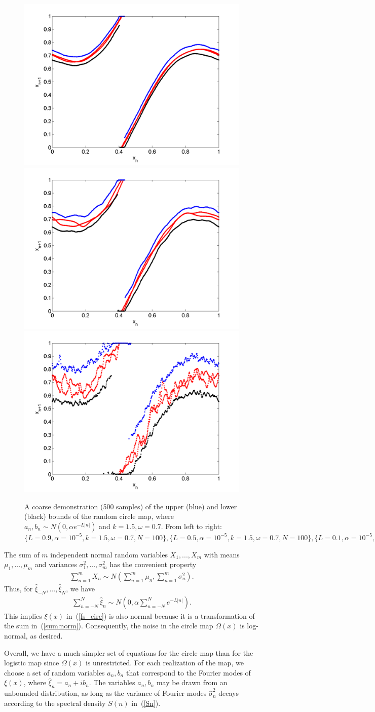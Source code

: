 \begin{figure}[htp]
\caption[Upper and lower bounds on the random circle map, with a normal
distribution, where $k=1.5,\omega=0.7$]{A coarse
  demonstration (500 samples) of the upper (blue) and lower (black)
  bounds of the random circle map, where $a_n,b_n\sim N(0,\alpha e^{-L|n|})$
  and $k=1.5,\omega=0.7$. From left to right:
  $\{L=0.9,\alpha = 10^{-5},k=1.5,\omega=0.7,N=100\}, \{L=0.5,\alpha = 10^{-5},k=1.5,\omega=0.7,N=100\},\{L=0.1,\alpha = 10^{-5},k=1.5,\omega=0.7,N=100\},$
  }\label{fig:circ_n_envelope3}
\centering
\includegraphics[width=.3\textwidth]{figs/envelope_norm_500_k15_L09_w07.png}\hfill
\includegraphics[width=.3\textwidth]{figs/envelope_norm_500_k15_L05_w07.png}\hfill
\includegraphics[width=.3\textwidth]{figs/envelope_norm_500_k15_L01_w07.png}
\end{figure}

The sum of $m$ independent normal random variables
$X_1, ..., X_m$ with means $\mu_1, ..., \mu_m$ and variances
$\sigma_1^2, ..., \sigma_m^2$ has the convenient property
\begin{align*}
\sum_{n=1}^mX_n \sim N\left(\sum_{n=1}^m\mu_n, \sum_{n=1}^m\sigma_n^2\right).
\end{align*}
Thus, for $\hat{\xi}_{-N},...,\hat{\xi}_N$, we have
\begin{align}\label{sum:norm}
\sum_{n=-N}^N \hat{\xi}_n \sim N\left(0, \alpha\sum_{n=-N}^N e^{-L|n|}\right).
\end{align}
This implies $\xi(x)$ in~(\ref{fs_circ}) is also normal because it is
a transformation of the sum in~(\ref{sum:norm}). Consequently, the
noise in the circle map $\Omega(x)$ is log-normal, as
desired. 

Overall, we have a much simpler set of equations for the circle map
than for the logistic map since $\Omega(x)$ is unrestricted. For each
realization of the map, we choose a set of random variables $a_n, b_n$
that correspond to the Fourier modes of $\xi(x)$, where $\hat{\xi}_n =
a_n + ib_n$. The variables $a_n, b_n$ may be drawn from an unbounded
distribution, as long as the variance of Fourier modes
$\hat{\sigma}_n^2$ decays according to the spectral density $S(n)$ in~(\ref{Sn}). 